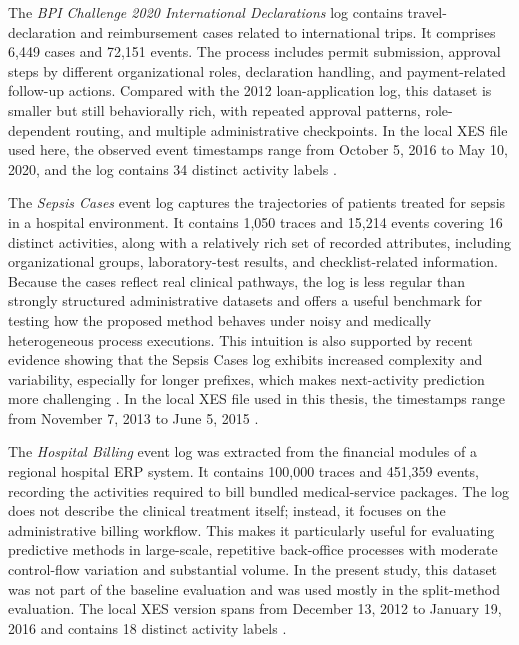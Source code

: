 The \textit{BPI Challenge 2020 International Declarations} log contains travel-declaration and reimbursement cases related to international trips. It comprises 6,449 cases and 72,151 events. The process includes permit submission, approval steps by different organizational roles, declaration handling, and payment-related follow-up actions. Compared with the 2012 loan-application log, this dataset is smaller but still behaviorally rich, with repeated approval patterns, role-dependent routing, and multiple administrative checkpoints. In the local XES file used here, the observed event timestamps range from October 5, 2016 to May 10, 2020, and the log contains 34 distinct activity labels \cite{bpi2020intl}.

The \textit{Sepsis Cases} event log captures the trajectories of patients treated for sepsis in a hospital environment. It contains 1,050 traces and 15,214 events covering 16 distinct activities, along with a relatively rich set of recorded attributes, including organizational groups, laboratory-test results, and checklist-related information. Because the cases reflect real clinical pathways, the log is less regular than strongly structured administrative datasets and offers a useful benchmark for testing how the proposed method behaves under noisy and medically heterogeneous process executions. This intuition is also supported by recent evidence showing that the Sepsis Cases log exhibits increased complexity and variability, especially for longer prefixes, which makes next-activity prediction more challenging \cite{casciani2026rag}. In the local XES file used in this thesis, the timestamps range from November 7, 2013 to June 5, 2015 \cite{sepsisdataset}.

The \textit{Hospital Billing} event log was extracted from the financial modules of a regional hospital ERP system. It contains 100,000 traces and 451,359 events, recording the activities required to bill bundled medical-service packages. The log does not describe the clinical treatment itself; instead, it focuses on the administrative billing workflow. This makes it particularly useful for evaluating predictive methods in large-scale, repetitive back-office processes with moderate control-flow variation and substantial volume. In the present study, this dataset was not part of the baseline evaluation and was used mostly in the split-method evaluation. The local XES version spans from December 13, 2012 to January 19, 2016 and contains 18 distinct activity labels \cite{hospitalbillingdataset}.

